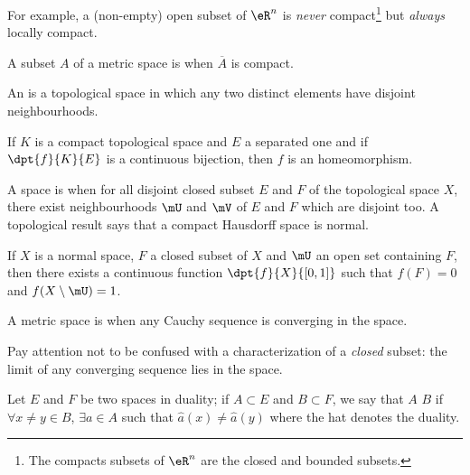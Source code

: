 For example, a (non-empty) open subset of $\eR^n$ is \emph{never} compact\footnote{The compacts subsets of $\eR^n$ are the closed and bounded subsets.} but \emph{always} locally compact.

\begin{definition}
	A subset $A$ of a metric space is  when $\overline{A}$ is compact.
\end{definition}

\begin{definition}
	An  is a topological space in which any two distinct elements have disjoint neighbourhoods.
\end{definition}


\begin{proposition}
	If $K$ is a compact topological space and $E$ a separated one and if $\dpt{f}{K}{E}$ is a continuous bijection, then $f$ is an homeomorphism. \label{lem:wiki}
\end{proposition}

\begin{definition}
	A space is  when for all disjoint closed subset $E$ and $F$ of the topological space $X$, there exist neighbourhoods $\mU$ and $\mV$ of $E$ and $F$ which are disjoint too. A topological result says that a compact Hausdorff space is normal.
\end{definition}

\begin{lemma}\label{lem:Urysohn}
	If $X$ is a normal space, $F$ a closed subset of $X$ and $\mU$ an open set containing $F$, then there exists a continuous function $\dpt{f}{X}{[0,1]}$ such that $f(F)=0$ and $f(X\setminus\mU)=1$.
\end{lemma}

\begin{definition}
	A metric space is  when any Cauchy sequence is converging in the space.
\end{definition}

Pay attention not to be confused with a characterization of a \emph{closed} subset: the limit of any converging sequence lies in the space.

\begin{definition}\label{def:separe}
	Let $E$ and $F$ be two spaces in duality; if $A\subset E$ and $B\subset F$, we say that $A$  $B$ if $\forall x\neq y\in B$, $\exists a\in A$ such that $\hat{a}(x)\neq\hat{a}(y)$ where the hat denotes the duality.
\end{definition}

